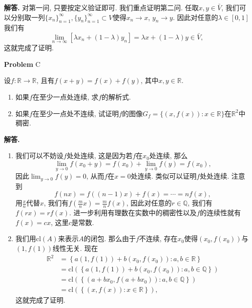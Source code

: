 \documentclass{article}
\newcounter{problemname}
\newenvironment{problem}{\begin{shaded}\stepcounter{problemname}\par\noindent\textbf{Problem }}{\end{shaded}\par}
\newenvironment{solution}{\par\noindent\textbf{解答. }}{\par}
\begin{document}
\begin{solution}
对第一问, 只要按定义验证即可. 我们重点证明第二问. 任取$x,y\in\bar{V}$, 我们可以分别取一列$\{x_n\}_{n=1}^\infty, \{y_n\}_{n=1}^\infty\subset V$使得$x_n\to x$, $y_n\to y$. 因此对任意的$\lambda\in[0,1]$我们有
$$
\lim_{n\rightarrow \infty} \left[ \lambda x_n+\left( 1-\lambda \right) y_n \right] =\lambda x+\left( 1-\lambda \right) y\in \bar{V},
$$
这就完成了证明.
\end{solution}
\begin{problem}{C}\par
设$f:\mathbb{R}\to\mathbb{R}$, 且有$f(x+y)=f(x)+f(y)$, 其中$x,y\in\mathbb{R}$.
\begin{enumerate}
    \item 如果$f$在至少一点处连续, 求$f$的解析式.
    \item 如果$f$在至少一点处不连续, 试证明$f$的图像$G_f=\{(x,f(x)):x\in\mathbb{R}\}$在$\mathbb{R}^2$中稠密.
\end{enumerate}
\end{problem}
\begin{solution}
\begin{enumerate}
    \item 我们可以不妨设$f$处处连续, 这是因为若$f$在$x_0$处连续, 那么
    $$
    \lim_{y\rightarrow 0} f\left( x_0+y \right) =f\left( x_0 \right) +\lim_{y\rightarrow 0} f\left( y \right) =f\left( x_0 \right) ,
    $$
    因此$\lim_{y\to 0}f(y)=0$, 从而$f$在$x=0$处连续. 类似可以证明$f$处处连续. 注意到
    $$
    f\left( nx \right) =f\left( \left( n-1 \right) x \right) +f\left( x \right) =\cdots =nf\left( x \right) ,
    $$
    用$\frac{x}{n}$代替$x$, 我们有$f\left(\frac{m}{n}x\right)=\frac{m}{n}f(x)$, 因此对任意的$r\in\mathbb{Q}$, 我们有$f(rx)=rf(x)$. 进一步利用有理数在实数中的稠密性以及$f$的连续性就有$f(x)=cx$, 这里$c$是常数.
    \item 我们用$\mathrm{cl}(A)$来表示$A$的闭包. 那么由于$f$不连续, 存在$x_0$使得$(x_0,f(x_0))$与$(1,f(1))$线性无关. 现在
    $$
    \begin{aligned}
\mathbb{R} ^2&=\left\{ a\left( 1,f\left( 1 \right) \right) +b\left( x_0,f\left( x_0 \right) \right) :a,b\in \mathbb{R} \right\} 
\\
&=\mathrm{cl}\left( \left\{ a\left( 1,f\left( 1 \right) \right) +b\left( x_0,f\left( x_0 \right) \right) :a,b\in \mathbb{Q} \right\} \right) 
\\
&=\mathrm{cl}\left( \left\{ \left( a+bx_0,f\left( a+bx_0 \right) \right) :a,b\in \mathbb{Q} \right\} \right) 
\\
&=\mathrm{cl}\left( \left\{ \left( x,f\left( x \right) \right) :x\in \mathbb{R} \right\} \right) ,
    \end{aligned}
    $$
    这就完成了证明.
\end{enumerate}
\end{solution}
\newpage
\end{document}
